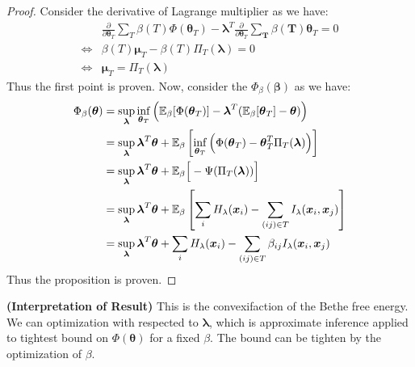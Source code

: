\begin{proof}
    Consider the derivative of Lagrange multiplier as we have:
    \begin{equation*}
    \begin{aligned}
        &\frac{\partial}{\partial \boldsymbol \theta_T} \sum_T\beta(T)\Phi(\boldsymbol \theta_T) - \boldsymbol \lambda^T\frac{\partial}{\partial \boldsymbol \theta_T}\sum_{\boldsymbol T}\beta(\boldsymbol T) \boldsymbol \theta_T = 0 \\
        \iff& \beta(T)\boldsymbol \mu_T - \beta(T)\Pi_T(\boldsymbol \lambda) = 0 \\
        \iff& \boldsymbol \mu_T = \Pi_T(\boldsymbol \lambda)
    \end{aligned}
    \end{equation*}
    Thus the first point is proven. Now, consider the $\Phi_\beta(\boldsymbol \beta)$ as we have:
    \begin{equation*}
    \begin{aligned}
        \Phi_\beta(\boldsymbol \theta) &= \sup_{\boldsymbol \lambda}\inf_{\boldsymbol \theta_T} \Big(\mathbb{E}_\beta[\Phi(\boldsymbol \theta_T)] - \boldsymbol\lambda^T(\mathbb{E}_\beta[\boldsymbol \theta_T] - \boldsymbol \theta)\Big) \\
        &= \sup_{\boldsymbol \lambda} \boldsymbol \lambda^T\boldsymbol \theta + \mathbb{E}_\beta\left[ \inf_{\boldsymbol \theta_T} \Big(\Phi(\boldsymbol \theta_T) - \boldsymbol \theta^T_T\Pi_T(\boldsymbol \lambda) \Big)  \right] \\
        &= \sup_{\boldsymbol \lambda} \boldsymbol \lambda^T\boldsymbol \theta + \mathbb{E}_\beta\Big[-\Psi(\Pi_T(\boldsymbol \lambda))\Big] \\
        &= \sup_{\boldsymbol \lambda} \boldsymbol \lambda^T\boldsymbol \theta + \mathbb{E}_\beta\left[ \sum_i H_\lambda(\boldsymbol x_i) - \sum_{(ij)\in T}I_\lambda(\boldsymbol x_i, \boldsymbol x_j) \right] \\
        &= \sup_{\boldsymbol \lambda} \boldsymbol \lambda^T\boldsymbol \theta + \sum_i H_\lambda(\boldsymbol x_i) - \sum_{(ij)\in T}\beta_{ij}I_\lambda(\boldsymbol x_i, \boldsymbol x_j) \\
    \end{aligned}
    \end{equation*}
    Thus the proposition is proven. 
\end{proof}

\begin{remark}{\textbf{(Interpretation of Result)}}
    This is the convexifaction of the Bethe free energy. We can optimization with respected to $\boldsymbol \lambda$, which is approximate inference applied to tightest bound on $\Phi(\boldsymbol \theta)$ for a fixed $\beta$. The bound can be tighten by the optimization of $\beta$.
\end{remark}

